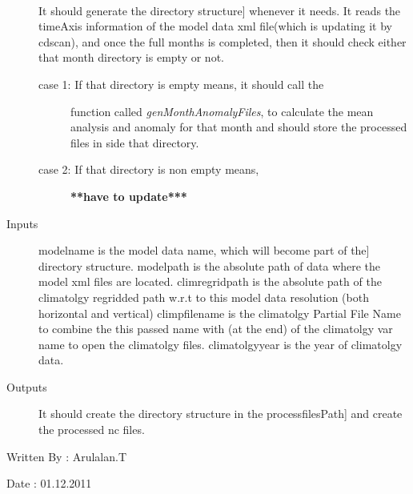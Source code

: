 \documentclass[letterpaper,10pt,english]{sphinxmanual}
\begin{document}
\begin{fulllineitems}
\label{diagnosis:compute_month_anomaly.genMonthAnomalyDirs}~\begin{description}
\item[{}] \leavevmode{[}It should generate the directory structure{]}
whenever it needs. It reads the timeAxis information of the
model data xml file(which is updating it by cdscan), and once
the full months is completed, then it should check either that
month directory is empty or not.
\begin{description}
\item[{case 1: If that directory is empty means, it should call the}] \leavevmode
function called \emph{genMonthAnomalyFiles}, to calculate
the mean analysis and anomaly for that month and should
store the processed files in side that directory.

\item[{case 2: If that directory is non empty means,}] \leavevmode
\textbf{**have to update***}

\end{description}

\item[{Inputs}] \leavevmode{[}modelname is the model data name, which will become part of the{]}
directory structure.
modelpath is the absolute path of data where the model xml files
are located.
climregridpath is the absolute path of the climatolgy regridded
path w.r.t to this model data resolution (both horizontal and
vertical)
climpfilename is the climatolgy Partial File Name to combine the
this passed name with (at the end) of the climatolgy var name to
open the climatolgy files.
climatolgyyear is the year of climatolgy data.

\item[{Outputs}] \leavevmode{[}It should create the directory structure in the processfilesPath{]}
and create the processed nc files.

\end{description}

Written By : Arulalan.T

Date : 01.12.2011

\end{fulllineitems}

\end{document}

